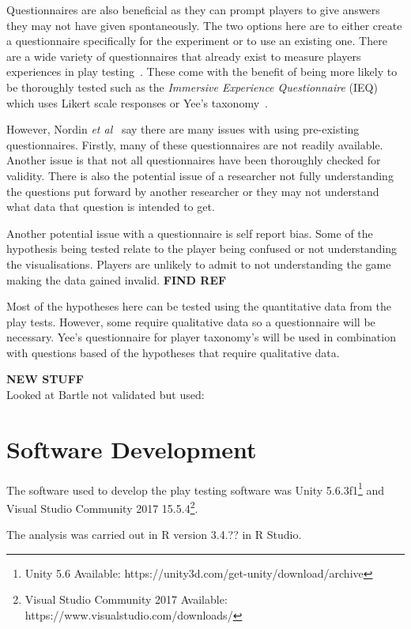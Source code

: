 \documentclass[journal]{IEEEtran}
\begin{document}
Questionnaires are also beneficial as they can prompt players to give answers they may not have given spontaneously. The two options here are to either create a questionnaire specifically for the experiment or to use an existing one. There are a wide variety of questionnaires that already exist to measure players experiences in play testing~\cite{nordin2014,Jennett2008}. These come with the benefit of being more likely to be thoroughly tested such as the \textit{Immersive Experience
Questionnaire} (IEQ) which uses Likert scale responses or Yee's taxonomy~\cite{nordin2014,Jennett2008, Yee2006, Yee2012}.
 
However, Nordin \textit{et al}~\cite{nordin2014} say there are many issues with using pre-existing questionnaires. Firstly, many of these questionnaires are not readily available. Another issue is that not all questionnaires have been thoroughly checked for validity. There is also the potential issue of a researcher not fully understanding the questions put forward by another researcher or they may not understand what data that question is intended to get.

Another potential issue with a questionnaire is self report bias. Some of the hypothesis being tested relate to the player being confused or not understanding the visualisations. Players are unlikely to admit to not understanding the game making the data gained invalid. \textbf{FIND REF}

Most of the hypotheses here can be tested using the quantitative data from the play tests. However, some require qualitative data so a questionnaire will be necessary. 
Yee's questionnaire for player taxonomy's will be used in combination with questions based of the hypotheses that require qualitative data.

\textbf{NEW STUFF} \\
Looked at Bartle not validated \cite{Bartle1996} but used: 

\section{Software Development} \label{softdev}
The software used to develop the play testing software was Unity 5.6.3f1\footnote[3]{Unity 5.6 Available: https://unity3d.com/get-unity/download/archive} and Visual Studio Community 2017  15.5.4\footnote[4]{Visual Studio Community 2017 Available: https://www.visualstudio.com/downloads/}.

The analysis was carried out in R version 3.4.?? in R Studio.
\end{document}
